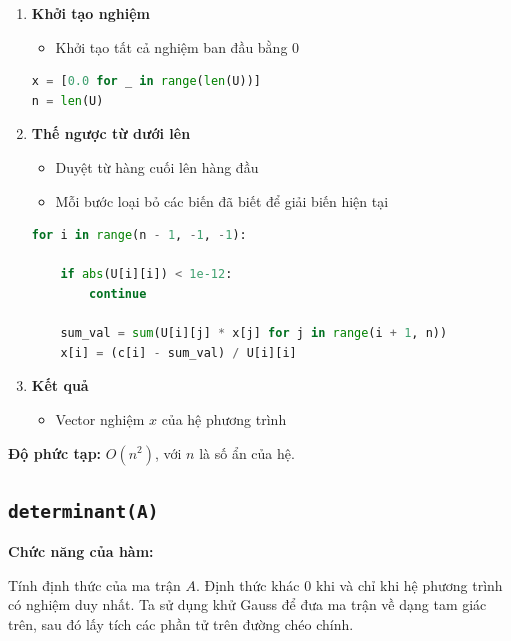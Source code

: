 \documentclass[a4paper,12pt]{report}
\begin{document}
\begin{enumerate}

\item \textbf{Khởi tạo nghiệm}

\begin{itemize}
    \item Khởi tạo tất cả nghiệm ban đầu bằng 0
\end{itemize}

\begin{lstlisting}[language=Python, caption={Khởi tạo nghiệm}]
x = [0.0 for _ in range(len(U))]
n = len(U)
\end{lstlisting}

\item \textbf{Thế ngược từ dưới lên}

\begin{itemize}
    \item Duyệt từ hàng cuối lên hàng đầu
    \item Mỗi bước loại bỏ các biến đã biết để giải biến hiện tại
\end{itemize}

\begin{lstlisting}[language=Python, caption={Thế ngược}]
for i in range(n - 1, -1, -1):

    if abs(U[i][i]) < 1e-12:
        continue

    sum_val = sum(U[i][j] * x[j] for j in range(i + 1, n))
    x[i] = (c[i] - sum_val) / U[i][i]
\end{lstlisting}

\item \textbf{Kết quả}

\begin{itemize}
    \item Vector nghiệm $x$ của hệ phương trình
\end{itemize}

\end{enumerate}
\textbf{Độ phức tạp:} $O(n^2)$, với $n$ là số ẩn của hệ.

\subsection[determinant(A)]{\texttt{determinant(A)}}

\textbf{Chức năng của hàm:}

Tính định thức của ma trận $A$. Định thức khác 0 khi và chỉ khi hệ phương trình có nghiệm duy nhất. Ta sử dụng khử Gauss để đưa ma trận về dạng tam giác trên, sau đó lấy tích các phần tử trên đường chéo chính.
\end{document}
